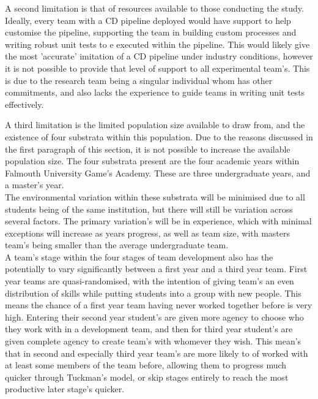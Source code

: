 \documentclass[lettersize,journal]{IEEEtran}
\begin{document}
        A second limitation is that of resources available to those conducting the study. Ideally, every team with a CD pipeline deployed would have support to help customise the pipeline, supporting the team in building custom processes and writing robust unit tests to e executed within the pipeline. This would likely give the most 'accurate' imitation of a CD pipeline under industry conditions, however it is not possible to provide that level of support to all experimental team's. This is due to the research team being a singular individual whom has other commitments, and also lacks the experience to guide teams in writing unit tests effectively.

        A third limitation is the limited population size available to draw from, and the existence of four substrata within this population. Due to the reasons discussed in the first paragraph of this section, it is not possible to increase the available population size. The four substrata present are  the four academic years within Falmouth University Game's Academy. These are three undergraduate years, and a master's year. \\
        The environmental variation within these substrata will be minimised due to all students being of the same institution, but there will still be variation across several factors. The primary variation's will be in experience, which with minimal exceptions will increase as years progress, as well as team size, with masters team's being smaller than the average undergraduate team. \\
        A team's stage within the four stages of team development \cite{tuckman1965developmental} also has the potentially to vary significantly between a first year and a third year team. First year teams are quasi-randomised, with the intention of giving team's an even distribution of skills while putting students into a group with new people. This means the chance of a first year team having never worked together before is very high. Entering their second year student's are given more agency to choose who they work with in a development team, and then for third year student's are given complete agency to create team's with whomever they wish. This mean's that in second and especially third year team's are more likely to of worked with at least some members of the team before, allowing them to progress much quicker through Tuckman's model, or skip stages entirely to reach the most productive later stage's quicker.
\end{document}

